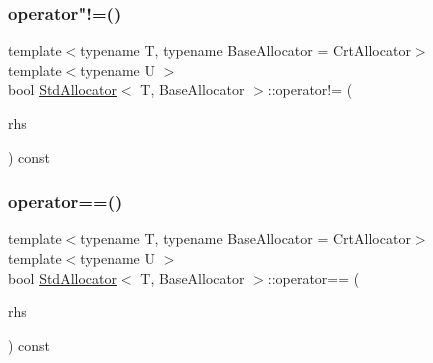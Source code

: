\mbox{\label{classStdAllocator_a6d1d3ae1297ec63f6043f06d26b99df7}} 
\subsubsection{\texorpdfstring{operator"!=()}{operator!=()}}
{\footnotesize\ttfamily template$<$typename T, typename Base\+Allocator = Crt\+Allocator$>$ \\
template$<$typename U $>$ \\
bool \hyperlink{classStdAllocator}{Std\+Allocator}$<$ T, Base\+Allocator $>$\+::operator!= (\begin{DoxyParamCaption}\item[{const \hyperlink{classStdAllocator}{Std\+Allocator}$<$ U, Base\+Allocator $>$ \&}]{rhs }\end{DoxyParamCaption}) const\hspace{0.3cm}{\ttfamily [inline]}}

\mbox{\label{classStdAllocator_acec867ea79558926a5e3a5f9bbafaf31}} 
\subsubsection{\texorpdfstring{operator==()}{operator==()}}
{\footnotesize\ttfamily template$<$typename T, typename Base\+Allocator = Crt\+Allocator$>$ \\
template$<$typename U $>$ \\
bool \hyperlink{classStdAllocator}{Std\+Allocator}$<$ T, Base\+Allocator $>$\+::operator== (\begin{DoxyParamCaption}\item[{const \hyperlink{classStdAllocator}{Std\+Allocator}$<$ U, Base\+Allocator $>$ \&}]{rhs }\end{DoxyParamCaption}) const\hspace{0.3cm}{\ttfamily [inline]}}

\mbox{\label{classStdAllocator_aa2743f6ccc125c6313917d8fd71dc847}} 
